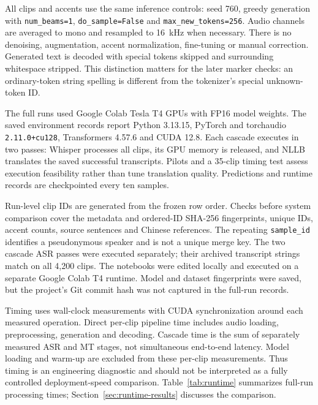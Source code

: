 All clips and accents use the same inference controls: seed 760, greedy
generation with \texttt{num\_beams=1}, \texttt{do\_sample=False} and
\texttt{max\_new\_tokens=256}. Audio channels are averaged to mono and resampled
to 16~kHz when necessary. There is no denoising, augmentation, accent
normalization, fine-tuning or manual correction. Generated text is decoded with
special tokens skipped and surrounding whitespace stripped. This distinction
matters for the later marker checks: an ordinary-token string spelling \unk{}
is different from the tokenizer's special unknown-token ID.

The full runs used Google Colab Tesla T4 GPUs with FP16 model weights. The saved
environment records report Python 3.13.15, PyTorch and torchaudio
\texttt{2.11.0+cu128}, Transformers 4.57.6 and CUDA 12.8.
Each cascade executes in two passes: Whisper processes all clips, its GPU
memory is released, and NLLB translates the saved successful transcripts.
Pilots and a 35-clip timing test assess execution feasibility rather than tune
translation quality. Predictions and runtime records are checkpointed every
ten samples.

Run-level clip IDs are generated from the frozen row order. Checks before system
comparison cover the metadata and ordered-ID SHA-256 fingerprints, unique IDs,
accent counts, source sentences and Chinese references. The repeating
\texttt{sample\_id} identifies a pseudonymous speaker and is not a unique merge
key. The two cascade ASR passes were executed separately; their archived
transcript strings match on all 4,200 clips. The notebooks were edited locally
and executed on a separate Google Colab T4 runtime. Model and dataset
fingerprints were saved, but the project's Git commit hash was not captured
in the full-run records.

Timing uses wall-clock measurements with CUDA synchronization around each
measured operation. Direct per-clip pipeline time includes audio loading,
preprocessing, generation and decoding. Cascade time is the sum of separately
measured ASR and MT stages, not simultaneous end-to-end latency. Model loading
and warm-up are excluded from these per-clip measurements. Thus timing is an
engineering diagnostic and should not be interpreted as a fully controlled
deployment-speed comparison.
Table~\ref{tab:runtime} summarizes full-run processing times;
Section~\ref{sec:runtime-results} discusses the comparison.
